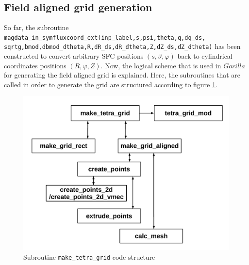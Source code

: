 \documentclass[./main.tex]{subfiles}
\begin{document}
\subsection{Field aligned grid generation}
So far, the subroutine \texttt{magdata\_in\_symfluxcoord\_ext(inp\_label,s,psi,theta,q,dq\_ds,\\sqrtg,bmod,dbmod\_dtheta,R,dR\_ds,dR\_dtheta,Z,dZ\_ds,dZ\_dtheta)} has been constructed to convert arbitrary SFC positions $(s,\vartheta,\varphi)$ back to cylindrical coordinates positions $(R,\varphi,Z)$. Now, the logical scheme that is used in $Gorilla$ for generating the field aligned grid is explained. Here, the subroutines that are called in order to generate the grid are structured according to figure \ref{fig:make_tetra_grid_code_structure}. 

\begin{figure}[H]
	\includegraphics[width=1.0\textwidth]{figures/make_tetra_grid_graphics.pdf}
	\caption{Subroutine \texttt{make\_tetra\_grid} code structure}
	\label{fig:make_tetra_grid_code_structure}
\end{figure}
\end{document}
